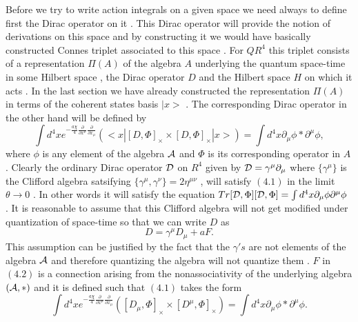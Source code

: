 \documentclass[a4paper,12pt]{article}
\begin{document}
 \vskip 5mm \noindent Before
we try to write action integrals on a given space we need always
to define first the Dirac operator on it . This Dirac operator
will provide the notion of derivations on this space and by
constructing it we would have basically constructed Connes triplet
associated to this space \cite{connes} . For $QR^4$
 this triplet consists of a representation ${\Pi}(A)$ of the algebra $A$ underlying the quantum space-time in some Hilbert
 space  , the  Dirac operator $D$ and the Hilbert space $H$ on which it acts
 . In the last section we have already constructed the representation ${\Pi}(A)$ in terms of the coherent states basis $|x>$ .
 The corresponding Dirac operator in the other hand  will be defined
 by \cite{sachin}
\begin{equation}
\int d^4x
e^{-\frac{a{\chi}}{4}{\frac{\partial}{{\partial}x^{\mu}}}{\frac{\partial}{{\partial}x_{\mu}}}}(<x|[D,\Phi]_{\times}{\times}[D,\Phi]_{\times}|x>)=\int
d^4x {\partial}_{\mu}\phi*{\partial}^{\mu}\phi,
\end{equation}
where $\phi$ is any element of the algebra ${\cal A}$ and $\Phi$ is its corresponding operator in $A$ .
 Clearly the ordinary Dirac operator ${\cal D}$ on $R^4$ given by ${\cal D}={\gamma}^{\mu}{\partial}_{\mu}$ where
 $\{{\gamma}^{\mu}\}$ is the Clifford algebra satsifying $\{{\gamma}^{\mu},{\gamma}^{\nu}\}=2{\eta}^{{\mu}{\nu}}$ ,
  will satisfy $(4.1)$ in the limit ${\theta}{\longrightarrow}0$ . In other words it will satisfy the equation $Tr[{\cal D},\Phi][{\cal D},\Phi]=\int
d^4x {\partial}_{\mu}\phi{\partial}^{\mu}\phi $ .
  It is reasonable to assume that this Clifford algebra will not get modified under
   quantization of space-time so that we can write $D$ as
\begin{equation}
   D={\gamma}^{\mu}D_{{\mu}}+ aF .
\end{equation}
   This assumption can be justified by the fact that the ${\gamma}'s$ are
   not elements of the algebra ${\cal A}$ and therefore quantizing the algebra
    will not quantize them . $F$ in $(4.2)$ is a connection arising from the nonassociativity of the underlying
    algebra $({\cal A},*)$ and it is defined such that $(4.1)$
    takes the form
\begin{equation}
\int d^4x
e^{-\frac{a{\chi}}{4}{\frac{\partial}{{\partial}x^{\mu}}}{\frac{\partial}{{\partial}x_{\mu}}}}([D_{\mu},\Phi]_{\times}{\times}[D^{\mu},\Phi]_{\times})=\int
d^4x{\partial}_{\mu}\phi*{\partial}^{\mu}\phi.
\end{equation}
\end{document}
